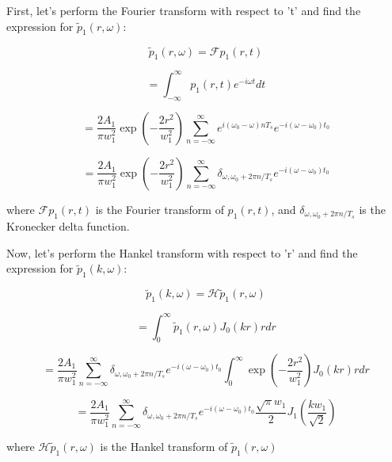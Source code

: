 \documentclass{resume} %
\begin{document}
 
\bigskip\bigskip\bigskip\bigskip\bigskip\bigskip\bigskip\bigskip\bigskip\bigskip\bigskip\bigskip\bigskip\bigskip\bigskip\bigskip\bigskip\bigskip

First, let's perform the Fourier transform with respect to 't' and find the expression for $\tilde{p}_1(r, \omega)$:

$$\tilde{p}_1(r, \omega) = \mathcal{F} {p_1(r, t)}$$

$$= \int_{-\infty}^{\infty} p_1(r, t) e^{-i \omega t} dt$$

$$ = \frac{2 A_1}{\pi w_1^2} \exp \left(-\frac{2 r^2}{w_1^2}\right) \sum_{n=-\infty}^{\infty} e^{i(\omega_0 - \omega) n T_s} e^{-i (\omega - \omega_0) t_0}$$

$$= \frac{2 A_1}{\pi w_1^2} \exp \left(-\frac{2 r^2}{w_1^2}\right) \sum_{n=-\infty}^{\infty} \delta_{\omega, \omega_0 + 2\pi n/T_s} e^{-i (\omega - \omega_0) t_0}$$

where $\mathcal{F} {p_1(r, t)}$ is the Fourier transform of $p_1(r, t)$, and $\delta_{\omega, \omega_0 + 2\pi n/T_s}$ is the Kronecker delta function.

Now, let's perform the Hankel transform with respect to 'r' and find the expression for $\tilde{p}_1(k, \omega)$:

$$\tilde{p}_1(k, \omega) = \mathcal{H} {\tilde{p}_1(r, \omega)}$$

$$ = \int_0^{\infty} \tilde{p}_1(r, \omega) J_0(kr) r dr$$

$$ = \frac{2 A_1}{\pi w_1^2} \sum_{n=-\infty}^{\infty} \delta_{\omega, \omega_0 + 2\pi n/T_s} e^{-i (\omega - \omega_0) t_0} \int_0^{\infty} \exp \left(-\frac{2 r^2}{w_1^2}\right) J_0(kr) r dr$$

$$ = \frac{2 A_1}{\pi w_1^2} \sum_{n=-\infty}^{\infty} \delta_{\omega, \omega_0 + 2\pi n/T_s} e^{-i (\omega - \omega_0) t_0} \frac{\sqrt{\pi} w_1}{2} J_1\left(\frac{kw_1}{\sqrt{2}}\right)$$

where $\mathcal{H} {\tilde{p}_1(r, \omega)}$ is the Hankel transform of $\tilde{p}_1(r, \omega)$
\end{document}
